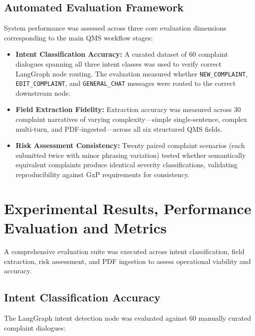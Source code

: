 \documentclass[12pt,a4paper]{report}
\begin{document}
\subsection{Automated Evaluation Framework}

System performance was assessed across three core evaluation dimensions corresponding to the main QMS workflow stages:

\begin{itemize}[leftmargin=*]
\item \textbf{Intent Classification Accuracy:} A curated dataset of 60 complaint dialogues spanning all three intent classes was used to verify correct LangGraph node routing. The evaluation measured whether \texttt{NEW\_COMPLAINT}, \texttt{EDIT\_COMPLAINT}, and \texttt{GENERAL\_CHAT} messages were routed to the correct downstream node.

\item \textbf{Field Extraction Fidelity:} Extraction accuracy was measured across 30 complaint narratives of varying complexity---simple single-sentence, complex multi-turn, and PDF-ingested---across all six structured QMS fields.

\item \textbf{Risk Assessment Consistency:} Twenty paired complaint scenarios (each submitted twice with minor phrasing variation) tested whether semantically equivalent complaints produce identical severity classifications, validating reproducibility against GxP requirements for consistency.
\end{itemize}

\section{Experimental Results, Performance Evaluation and Metrics}

A comprehensive evaluation suite was executed across intent classification, field extraction, risk assessment, and PDF ingestion to assess operational viability and accuracy.

\subsection{Intent Classification Accuracy}

The LangGraph intent detection node was evaluated against 60 manually curated complaint dialogues:
\end{document}
